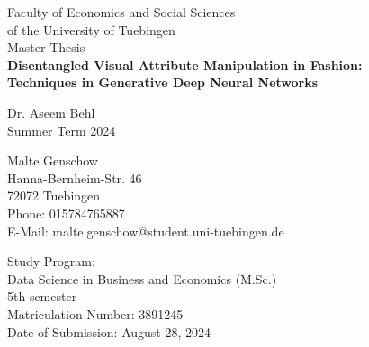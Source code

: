 \documentclass[a4paper,12pt]{article}
\begin{document}
\setlength{\abovedisplayskip}{6pt}
\setlength{\belowdisplayskip}{6pt}




\begin{titlepage}       
\thispagestyle{empty}   
\begin{center}
\large Faculty of Economics and Social Sciences \\of the University of Tuebingen \\
\vspace*{1cm}
{Master Thesis} \\
\vspace*{2.5cm}
{\bf  \large Disentangled Visual Attribute Manipulation in Fashion: \\ Techniques in Generative Deep Neural Networks} \\
\vspace*{3cm} 

Dr. Aseem Behl \\
\vspace*{0.5cm} 
\normalsize {Summer Term 2024} \\
\vspace*{0.5cm} 
\end{center}


\vfill
\begin{footnotesize}
    

\begin{minipage}[t]{0.5\linewidth}
  Malte Genschow \\
  Hanna-Bernheim-Str. 46 \\
  72072 Tuebingen \\
  Phone: 015784765887 \\
  E-Mail: malte.genschow@student.uni-tuebingen.de
 \end{minipage}
\begin{minipage}[t]{0.5\linewidth}
  Study Program: \\
  Data Science in Business and Economics (M.Sc.) \\
  5th semester \\
  Matriculation Number: 3891245 \\
  Date of Submission: 
  August 28, 2024
 \end{minipage}

\end{footnotesize}
\end{titlepage}
\newpage      
\end{document}
